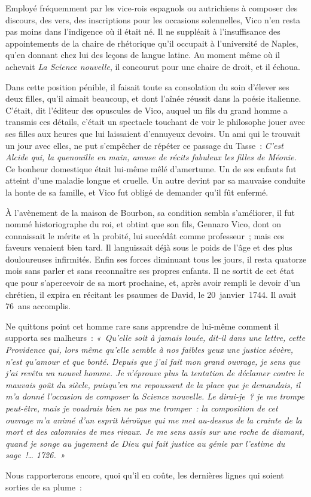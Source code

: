 \documentclass[french,twoside]{book} %
\begin{document}
Employé fréquemment par les vice-rois espagnols ou autrichiens à composer des discours, des vers, des inscriptions pour les occasions solennelles, Vico n’en resta pas moins dans l’indigence où il était né. Il ne suppléait à l’insuffisance des appointements de la chaire de rhétorique qu’il occupait à l’université de Naples, qu’en donnant chez lui des leçons de langue latine. Au moment même où il achevait {\itshape La Science nouvelle}, il concourut pour une chaire de droit, et il échoua.\par
Dans cette position pénible, il faisait toute sa consolation du soin d’élever ses deux filles, qu’il aimait beaucoup, et dont l’aînée réussit dans la poésie italienne. C’était, dit l’éditeur des opuscules de Vico, auquel un fils du grand homme a transmis ces détails, c’était un spectacle touchant de voir le philosophe jouer avec ses filles aux heures que lui laissaient d’ennuyeux devoirs. Un ami qui le trouvait un jour avec elles, ne put s’empêcher de répéter ce passage du Tasse : \emph{{\itshape C’est Alcide qui, la quenouille en main, amuse de récits fabuleux les filles de Méonie.}} Ce bonheur domestique était lui-même mêlé d’amertume. Un de ses enfants fut atteint d’une maladie longue et cruelle. Un autre  devint par sa mauvaise conduite la honte de sa famille, et Vico fut obligé de demander qu’il fût enfermé.\par
À l’avènement de la maison de Bourbon, sa condition sembla s’améliorer, il fut nommé historiographe du roi, et obtint que son fils, Gennaro Vico, dont on connaissait le mérite et la probité, lui succédât comme professeur ; mais ces faveurs venaient bien tard. Il languissait déjà sous le poids de l’âge et des plus douloureuses infirmités. Enfin ses forces diminuant tous les jours, il resta quatorze mois sans parler et sans reconnaître ses propres enfants. Il ne sortit de cet état que pour s’apercevoir de sa mort prochaine, et, après avoir rempli le devoir d’un chrétien, il expira en récitant les psaumes de David, le 20 janvier 1744. Il avait 76 ans accomplis.\par
Ne quittons point cet homme rare sans apprendre de lui-même comment il supporta ses malheurs : \emph{« Qu’elle soit à jamais louée, dit-il dans une lettre, cette Providence qui, lors même qu’elle semble à nos faibles yeux une justice sévère, n’est qu’amour et que bonté. Depuis que j’ai fait mon grand ouvrage, je sens que j’ai revêtu un nouvel homme. Je n’éprouve plus la tentation de déclamer contre le mauvais goût du siècle, puisqu’en me repoussant de la place que je demandais, il m’a donné l’occasion de composer la Science nouvelle. Le  dirai-je ? je me trompe peut-être, mais je voudrais bien ne pas me tromper : la composition de cet ouvrage m’a animé d’un esprit héroïque qui me met au-dessus de la crainte de la mort et des calomnies de mes rivaux. Je me sens assis sur une roche de diamant, quand je songe au jugement de Dieu qui fait justice au génie par l’estime du sage !… 1726. »}\par
Nous rapporterons encore, quoi qu’il en coûte, les dernières lignes qui soient sorties de sa plume :\par
\end{document}
